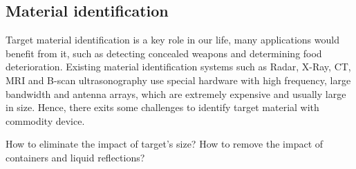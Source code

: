 %
%
%

\subsection{Material identification} Target material identification is a key role in our life, many applications would benefit from it, such as detecting concealed weapons and determining food deterioration. Existing material identification systems such as Radar, X-Ray, CT, MRI and B-scan ultrasonography use special hardware with high frequency, large bandwidth and antenna arrays, which are extremely expensive and usually large in size. Hence, there exits some challenges to identify target material with commodity device.

How to eliminate the impact of target's size? How to remove the impact of containers and liquid reflections?

